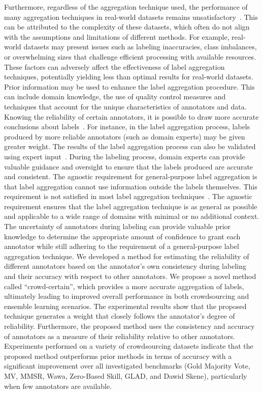 Furthermore, regardless of the aggregation technique used, the performance of many aggregation techniques in real-world datasets remains unsatisfactory~\cite{liu_Exploiting_2021}. This can be attributed to the complexity of these datasets, which often do not align with the assumptions and limitations of different methods. For example, real-world datasets may present issues such as labeling inaccuracies, class imbalances, or overwhelming sizes that challenge efficient processing with available resources. These factors can adversely affect the effectiveness of label aggregation techniques, potentially yielding less than optimal results for real-world datasets.
Prior information may be used to enhance the label aggregation procedure.
This can include domain knowledge, the use of quality control measures and techniques that account for the unique characteristics of annotators and data. Knowing the reliability of certain annotators, it is possible to draw more accurate conclusions about labels~\cite{li_Crowdsourced_2017}. For instance, in the label aggregation process, labels produced by more reliable annotators (such as domain experts) may be given greater weight. The results of the label aggregation process can also be validated using expert input~\cite{liu_Improving_2017}. During the labeling process, domain experts can provide valuable guidance and oversight to ensure that the labels produced are accurate and consistent.
The agnostic requirement for general-purpose label aggregation is that label aggregation cannot use information outside the labels themselves. This requirement is not satisfied in most label aggregation techniques~\cite{zhang_Crowdsourced_2019}. The agnostic requirement ensures that the label aggregation technique is as general as possible and applicable to a wide range of domains with minimal or no additional context.
The uncertainty of annotators during labeling can provide valuable prior knowledge to determine the appropriate amount of confidence to grant each annotator while still adhering to the requirement of a general-purpose label aggregation technique. We developed a method for estimating the reliability of different annotators based on the annotator's own consistency during labeling and their accuracy with respect to other annotators.
We propose a novel method called ``crowd-certain'', which provides a more accurate aggregation of labels, ultimately leading to improved overall performance in both crowdsourcing and ensemble learning scenarios. The experimental results show that the proposed technique generates a weight that closely follows the annotator's degree of reliability. Furthermore, the proposed method uses the consistency and accuracy of annotators as a measure of their reliability relative to other annotators. Experiments performed on a variety of crowdsourcing datasets indicate that the proposed method outperforms prior methods in terms of accuracy with a significant improvement over all investigated benchmarks (Gold Majority Vote, MV, MMSR, Wawa, Zero-Based Skill, GLAD, and Dawid Skene), particularly when few annotators are available.

